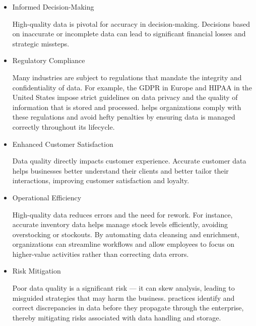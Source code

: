 \begin{itemize}
    \item   Informed Decision-Making
    
    High-quality data is pivotal for accuracy in decision-making. Decisions based on inaccurate or incomplete data can lead to significant financial losses and strategic missteps.

    \item   Regulatory Compliance
    
    Many industries are subject to regulations that mandate the integrity and confidentiality of data. For example, the GDPR in Europe and HIPAA in the United States impose strict guidelines on data privacy and the quality of information that is stored and processed.
         helps organizations comply with these regulations and avoid hefty penalties by ensuring data is managed correctly throughout its lifecycle.

    \item   Enhanced Customer Satisfaction

    Data quality directly impacts customer experience. Accurate customer data helps businesses better understand their clients and better tailor their interactions, improving customer satisfaction and loyalty.

    \item Operational Efficiency
    
    High-quality data reduces errors and the need for rework. For instance, accurate inventory data helps manage stock levels efficiently, avoiding overstocking or stockouts.
    By automating data cleansing and enrichment, organizations can streamline workflows and allow employees to focus on higher-value activities rather than correcting data errors.    

    \item     Risk Mitigation

    Poor data quality is a significant risk — it can skew analysis, leading to misguided strategies that may harm the business.
     practices identify and correct discrepancies in data before they propagate through the enterprise, thereby mitigating risks associated with data handling and storage.

\end{itemize}




